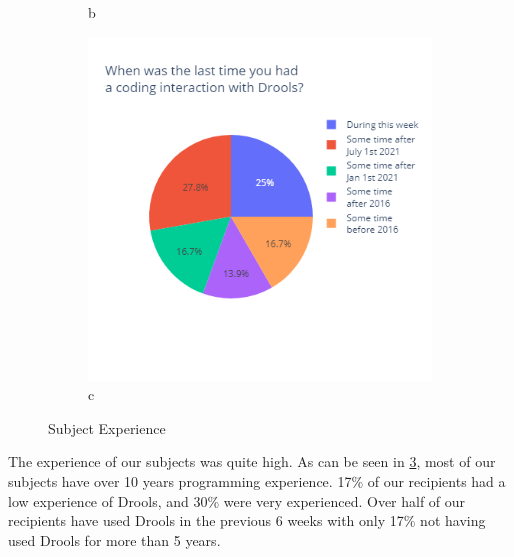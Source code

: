 \begin{figure}[H]
\begin{subfigure}{.33\textwidth}
      \caption{b}
      \label{fig:sfig2}
    \end{subfigure}
    \begin{subfigure}{.33\textwidth}
        \centering
        \includegraphics[width=.95\linewidth]{Sections/images/pie_recentusage.png}
        \caption{c}
        \label{fig:sfig3}
      \end{subfigure}
    \caption{Subject Experience}
    \label{fig:subject_experience}
\end{figure}

The experience of our subjects was quite high.
As can be seen in \ref{fig:subject_experience}, most of our subjects have over 10 years programming experience.
17\% of our recipients had a low experience of Drools, and 30\% were very experienced.
Over half of our recipients have used Drools in the previous 6 weeks with only 17\% not having used Drools for more than 5 years.

